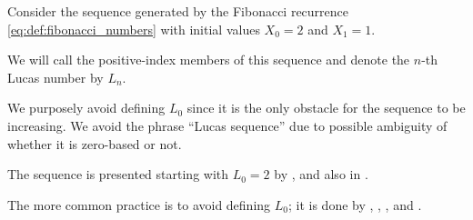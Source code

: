 \begin{definition}\label{def:lucas_numbers}
  Consider the sequence generated by the Fibonacci recurrence \eqref{eq:def:fibonacci_numbers} with initial values \( X_0 = 2 \) and \( X_1 = 1 \).

  We will call the positive-index members of this sequence  and denote the \( n \)-th Lucas number by \( L_n \).
\end{definition}
\begin{comments}
  \item We purposely avoid defining \( L_0 \) since it is the only obstacle for the sequence to be increasing. We avoid the phrase \enquote{Lucas sequence} due to possible ambiguity of whether it is zero-based or not.

  \item The sequence is presented starting with \( L_0 = 2 \) by , and also in \cite[142]{RosenEtAl2018DiscreteMathematicsHandbook}.

  The more common practice is to avoid defining \( L_0 \); it is done by , , ,  and .
\end{comments}

